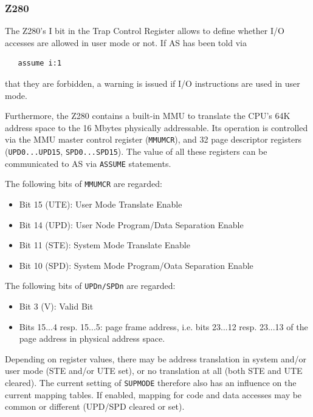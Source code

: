 \documentclass[12pt,twoside]{report}
\newcommand{\asname}{{AS}}
\begin{document}

\subsubsection{Z280}

The Z280's I bit in the Trap Control Register allows to define whether I/O
accesses are allowed in user mode or not.  If \asname{} has been told via
\begin{verbatim}
   assume i:1
\end{verbatim}
that they are forbidden, a warning is issued if I/O instructions are used in
user mode.

Furthermore, the Z280 contains a built-in MMU to translate the CPU's 64K
address space to the 16 Mbytes physically addressable.  Its operation is
controlled via the MMU master control register ({\tt MMUMCR}), and 32
page descriptor registers ({\tt UPD0...UPD15}, {\tt SPD0...SPD15}).  The
value of all these registers can be communicated to \asname{} via
{\tt ASSUME} statements.

The following bits of {\tt MMUMCR} are regarded:
\begin{itemize}
\item{Bit 15 (UTE): User Mode Translate Enable}
\item{Bit 14 (UPD): User Node Program/Data Separation Enable}
\item{Bit 11 (STE): System Mode Translate Enable}
\item{Bit 10 (SPD): System Mode Program/Oata Separation Enable}
\end{itemize}

The following bits of {\tt UPDn/SPDn} are regarded:
\begin{itemize}
\item{Bit 3 (V): Valid Bit}
\item{Bits 15...4 resp. 15...5: page frame address, i.e. bits 23...12
      resp. 23...13 of the page address in physical address space.}
\end{itemize}

Depending on register values, there may be address translation
in system and/or user mode (STE and/or UTE set), or no translation
at all (both STE and UTE cleared).  The current setting of {\tt SUPMODE}
therefore also has an influence on the current mapping tables.  If
enabled, mapping for code and data accesses may be common or different
(UPD/SPD cleared or set).
\end{document}
